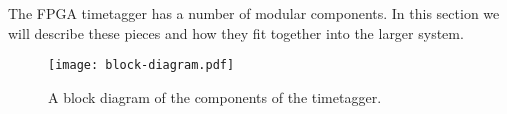 The FPGA timetagger has a number of modular components. In this
section we will describe these pieces and how they fit together into
the larger system.

\begin{figure}
  \center
  \texttt{[image: block-diagram.pdf]}
  \caption{A block diagram of the components of the timetagger.}
\end{figure}


